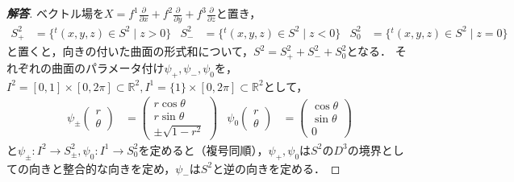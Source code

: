 \documentclass[dvipdfmx,uplatex,nosetpagesize]{jsarticle}
\theoremstyle{definition}
\theoremstyle{StatementsWithStar}
\theoremstyle{StatementsWithStar2}
\theoremstyle{StatementsWithStar3}
\theoremstyle{StatementsWithCCirc}
\theoremstyle{definition}
\begin{document}
\par
%
%
\noindent

\begin{proof}[\bf{解答}]

ベクトル場を$X=f^1\frac{\partial}{\partial x}+f^2\frac{\partial}{\partial y}+f^3\frac{\partial}{\partial z}$と置き，
\begin{align*}
    S^2_+&=\{{}^t(x,y,z)\in S^2\mid z>0 \} & S^2_-&=\{{}^t(x,y,z)\in S^2\mid z<0 \} & S^2_0&=\{{}^t(x,y,z)\in S^2\mid z=0 \}
\end{align*}
と置くと，向きの付いた曲面の形式和について，$S^2=S^2_++S^2_-+S^2_0$となる．
それぞれの曲面のパラメータ付け$\psi_+,\psi_-,\psi_0$を，$I^2=[0,1]\times [0,2\pi]\subset\mathbb{R}^2, I^1=\{1\}\times [0,2\pi]\subset\mathbb{R}^2$として，
\begin{align*}
    \psi_\pm \begin{pmatrix}r\\\theta\end{pmatrix} &= \begin{pmatrix}r\cos\theta\\r\sin\theta\\\pm\sqrt{1-r^2}\end{pmatrix}& \psi_0\begin{pmatrix}r\\\theta\end{pmatrix} &= \begin{pmatrix}\cos\theta\\\sin\theta\\0\end{pmatrix}
\end{align*}
と$\psi_\pm:I^2\to S^2_\pm, \psi_0:I^1\to S^2_0$を定めると（複号同順），$\psi_+,\psi_0$は$S^2$の$D^3$の境界としての向きと整合的な向きを定め，$\psi_-$は$S^2$と逆の向きを定める．


\end{proof}
\end{document}
